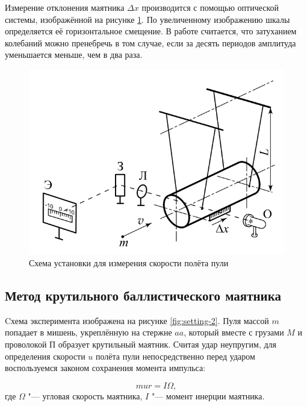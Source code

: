             Измерение отклонения маятника $\Delta x$ производится с помощью оптической системы, изображённой на рисунке \ref{fig:setting-1}. По увеличенному изображению шкалы определяется её горизонтальное смещение.
            В работе считается, что затуханием колебаний можно пренебречь в том случае, если за десять периодов амплитуда уменьшается меньше, чем в два раза.

            \begin{figure}
                \centering
                \includegraphics[width=0.75\linewidth]{setting-1.png}
                \caption{Схема установки для измерения скорости полёта пули}
                \label{fig:setting-1}
            \end{figure}

        \subsection{Метод крутильного баллистического маятника}
            Cхема эксперимента изображена на рисунке \ref{fig:setting-2}. Пуля массой $m$ попадает в мишень, укреплённую на стержне $aa$, который вместе с грузами $M$ и проволокой П образует крутильный маятник. Считая удар неупругим, для определения скорости $u$ полёта пули непосредственно перед ударом воспользуемся законом сохранения момента импульса:

            \begin{equation}
                mur = I\Omega,
                \label{eq:6}
            \end{equation}
            где $\Omega$ "--- угловая скорость маятника, $I$ "--- момент инерции маятника.
            
